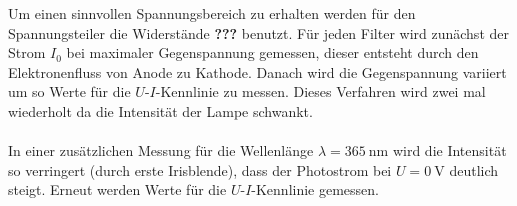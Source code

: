 Um einen sinnvollen Spannungsbereich zu erhalten werden für den Spannungsteiler die Widerstände \textbf{???} benutzt. Für jeden Filter wird zunächst der Strom $I_0$ bei maximaler Gegenspannung gemessen, dieser entsteht durch den Elektronenfluss von Anode zu Kathode. Danach wird die Gegenspannung variiert um so Werte für die $U$-$I$-Kennlinie zu messen. Dieses Verfahren wird zwei mal wiederholt da die Intensität der Lampe schwankt. \\ \\

In einer zusätzlichen Messung für die Wellenlänge $\lambda=\si{365 \ \nano \metre}$ wird die Intensität so verringert (durch erste Irisblende), dass der Photostrom bei $U=\si{0 \ \volt}$ deutlich steigt. Erneut werden Werte für die $U$-$I$-Kennlinie gemessen.
